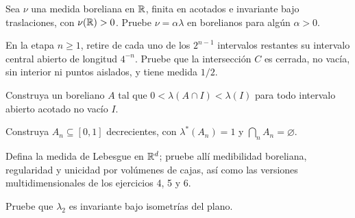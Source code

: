 \begin{ejercicio}\label{ej:v2-l06-6}
Sea $\nu$ una medida boreliana en $\mathbb R$, finita en acotados e invariante bajo traslaciones, con $\nu(\mathbb R)>0$. Pruebe $\nu=\alpha\lambda$ en borelianos para algún $\alpha>0$.
\end{ejercicio}

\begin{ejercicio}\label{ej:v2-l06-7}
En la etapa $n\ge1$, retire de cada uno de los $2^{n-1}$ intervalos restantes su intervalo central abierto de longitud $4^{-n}$. Pruebe que la intersección $C$ es cerrada, no vacía, sin interior ni puntos aislados, y tiene medida $1/2$.
\end{ejercicio}

\begin{ejercicio}\label{ej:v2-l06-8}
Construya un boreliano $A$ tal que $0<\lambda(A\cap I)<\lambda(I)$ para todo intervalo abierto acotado no vacío $I$.
\end{ejercicio}

\begin{ejercicio}\label{ej:v2-l06-9}
Construya $A_n\subseteq[0,1]$ decrecientes, con $\lambda^*(A_n)=1$ y $\bigcap_nA_n=\varnothing$.
\end{ejercicio}

\begin{ejercicio}\label{ej:v2-l06-10}
Defina la medida de Lebesgue en $\mathbb R^d$; pruebe allí medibilidad boreliana, regularidad y unicidad por volúmenes de cajas, así como las versiones multidimensionales de los ejercicios 4, 5 y 6.
\end{ejercicio}

\begin{ejercicio}\label{ej:v2-l06-11}
Pruebe que $\lambda_2$ es invariante bajo isometrías del plano.
\end{ejercicio}
